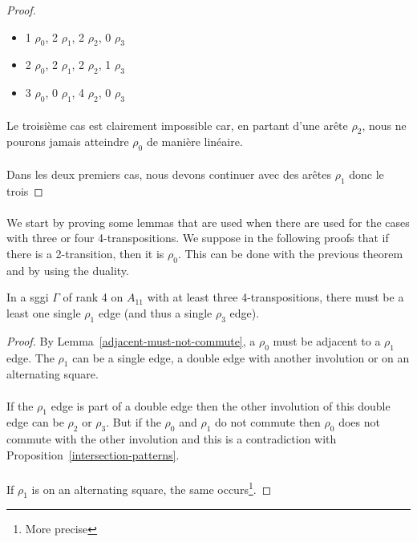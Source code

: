 \begin{proof}
  \begin{itemize}
    \item 1 $\rho_0$, 2 $\rho_1$, 2 $\rho_2$, 0 $\rho_3$
    \item 2 $\rho_0$, 2 $\rho_1$, 2 $\rho_2$, 1 $\rho_3$
    \item 3 $\rho_0$, 0 $\rho_1$, 4 $\rho_2$, 0 $\rho_3$
  \end{itemize}

  \paragraph{}
  Le troisième cas est clairement impossible car, en partant d'une arête $\rho_2$, nous ne pourons jamais atteindre $\rho_0$ de manière linéaire.

  \paragraph{}
  Dans les deux premiers cas, nous devons continuer avec des arêtes $\rho_1$ donc le trois

\end{proof}

\paragraph{}
We start by proving some lemmas that are used when there are used for the cases with three or four 4-transpositions. We suppose in the following proofs that if there is a 2-transition, then it is $\rho_0$. This can be done with the previous theorem and by using the duality.

\begin{lemma}
  In a sggi $\Gamma$ of rank 4 on $A_{11}$ with at least three 4-transpositions, there must be a least one single $\rho_1$ edge (and thus a single $\rho_3$ edge).
\end{lemma}

\begin{proof}
  By Lemma~\ref{adjacent-must-not-commute}, a $\rho_0$ must be adjacent to a $\rho_1$ edge. The $\rho_1$ can be a single edge, a double edge with another involution or on an alternating square.

  \paragraph{}
  If the $\rho_1$ edge is part of a double edge then the other involution of this double edge can be $\rho_2$ or $\rho_3$. But if the $\rho_0$ and $\rho_1$ do not commute then $\rho_0$ does not commute with the other involution and this is a contradiction with Proposition~\ref{intersection-patterns}.

  \paragraph{}
  If $\rho_1$ is on an alternating square, the same occurs\footnote{More precise}.

\end{proof}

